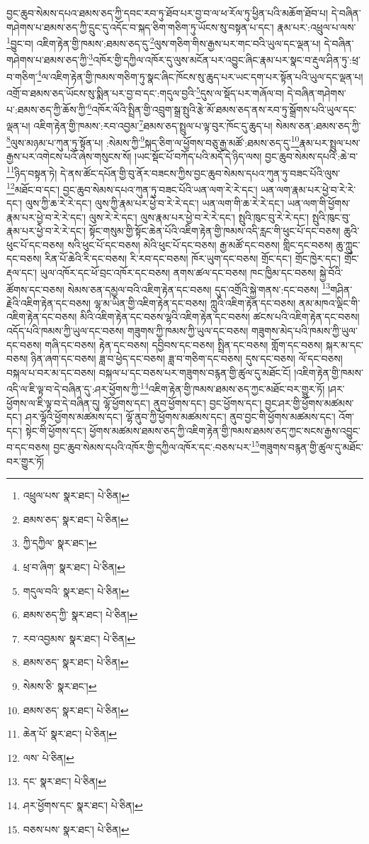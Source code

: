 བྱང་ཆུབ་སེམས་དཔའ་ཐམས་ཅད་ཀྱི་དབང་རབ་ཏུ་ཐོབ་པར་བྱ་བ་ལ་ཕ་རོལ་ཏུ་ཕྱིན་པའི་མཆོག་ཐོབ་པ། དེ་བཞིན་གཤེགས་པ་ཐམས་ཅད་ཀྱི་དྲུང་དུ་འདོང་བ་སྐད་ཅིག་གཅིག་ཏུ་ཡོངས་སུ་བསྟན་པ་དང་། རྣམ་པར་:འཕྲུལ་པ་ལས་\footnote{འཕྲུལ་པས་  སྣར་ཐང་།  པེ་ཅིན། }བྱུང་བ། འཇིག་རྟེན་གྱི་ཁམས་:ཐམས་ཅད་དུ་\footnote{ཐམས་ཅད་  སྣར་ཐང་།  པེ་ཅིན། }ལུས་གཅིག་གིས་རྒྱས་པར་གང་བའི་ཡུལ་དང་ལྡན་པ། དེ་བཞིན་གཤེགས་པ་ཐམས་ཅད་ཀྱི་\footnote{ཀྱི་དཀྱིལ་  སྣར་ཐང་། }འཁོར་གྱི་དཀྱིལ་འཁོར་དུ་ལུས་མངོན་པར་འབྱུང་ཞིང་རྣམ་པར་སྣང་བ་རྡུལ་ཤིན་ཏུ་:ཕྲ་བ་གཅིག་\footnote{ཕྲ་བ་ཞིག་  སྣར་ཐང་།  པེ་ཅིན། }ལ་འཇིག་རྟེན་གྱི་ཁམས་གཅིག་ཏུ་སྣང་ཞིང་ཁོངས་སུ་ཆུད་པར་ཡང་དག་པར་སྟོན་པའི་ཡུལ་དང་ལྡན་པ། འགྲོ་བ་ཐམས་ཅད་ཡོངས་སུ་སྨིན་པར་བྱ་བ་དང་:གདུལ་བྱའི་\footnote{གདུལ་བའི་  སྣར་ཐང་།  པེ་ཅིན། }དུས་ལ་སྡོད་པར་གཞོལ་བ། དེ་བཞིན་གཤེགས་པ་:ཐམས་ཅད་ཀྱི་ཆོས་ཀྱི་\footnote{ཐམས་ཅད་ཀྱི་  སྣར་ཐང་།  པེ་ཅིན། }འཁོར་ལོའི་སྤྲིན་གྱི་འབྲུག་སྒྲ་སྤུའི་རྩེ་མོ་ཐམས་ཅད་ནས་རབ་ཏུ་སྒྲོགས་པའི་ཡུལ་དང་ལྡན་པ། འཇིག་རྟེན་གྱི་ཁམས་:རབ་འབྱམ་\footnote{རབ་འབྱམས་  སྣར་ཐང་།  པེ་ཅིན། }ཐམས་ཅད་སྤྲུལ་པ་ལྟ་བུར་ཁོང་དུ་ཆུད་པ། སེམས་ཅན་:ཐམས་ཅད་ཀྱི་\footnote{ཐམས་ཅད་  སྣར་ཐང་།  པེ་ཅིན། }ལུས་མཉམ་པ་ཀུན་ཏུ་སྟོན་པ། :སེམས་ཀྱི་\footnote{སེམས་ཅི་  སྣར་ཐང་། }སྐད་ཅིག་ལ་ཕྱོགས་བཅུ་རྒྱ་མཚོ་:ཐམས་ཅད་དུ་\footnote{ཐམས་ཅད་  སྣར་ཐང་།  པེ་ཅིན། }རྣམ་པར་སྤྲུལ་པས་རྒྱས་པར་འགེངས་པའོ་ཞེས་གསུངས་སོ། །ཡང་སྡོང་པོ་བཀོད་པའི་མདོ་དེ་ཉིད་ལས། བྱང་ཆུབ་སེམས་དཔའི་:ཆེ་བ་\footnote{ཆེན་པོ་  སྣར་ཐང་།  པེ་ཅིན། }ཉིད་བསྟན་ཏེ། དེ་ནས་ཚོང་དཔོན་གྱི་བུ་ནོར་བཟངས་ཀྱིས་བྱང་ཆུབ་སེམས་དཔའ་ཀུན་ཏུ་བཟང་པོའི་ལུས་\footnote{ལས་  པེ་ཅིན། }མཐོང་བ་དང་། བྱང་ཆུབ་སེམས་དཔའ་ཀུན་ཏུ་བཟང་པོའི་ཡན་ལག་རེ་རེ་དང་། ཡན་ལག་རྣམ་པར་ཕྱེ་བ་རེ་རེ་དང་། ལུས་ཀྱི་ཆ་རེ་རེ་དང་། ལུས་ཀྱི་རྣམ་པར་ཕྱེ་བ་རེ་རེ་དང་། ཡན་ལག་གི་ཆ་རེ་རེ་དང་། ཡན་ལག་གི་ཕྱོགས་རྣམ་པར་ཕྱེ་བ་རེ་རེ་དང་། ལུས་རེ་རེ་དང་། ལུས་རྣམ་པར་ཕྱེ་བ་རེ་རེ་དང་། སྤུའི་ཁུང་བུ་རེ་རེ་དང་། སྤུའི་ཁུང་བུ་རྣམ་པར་ཕྱེ་བ་རེ་རེ་དང་། སྟོང་གསུམ་གྱི་སྟོང་ཆེན་པོའི་འཇིག་རྟེན་གྱི་ཁམས་འདི་རླང་གི་ཕུང་པོ་དང་བཅས། ཆུའི་ཕུང་པོ་དང་བཅས། སའི་ཕུང་པོ་དང་བཅས། མེའི་ཕུང་པོ་དང་བཅས། རྒྱ་མཚོ་དང་བཅས། གླིང་དང་བཅས། ཆུ་ཀླུང་དང་བཅས། རིན་པོ་ཆེའི་རི་དང་བཅས། རི་རབ་དང་བཅས། ཁོར་ཡུག་དང་བཅས། གྲོང་དང་། གྲོང་ཁྱེར་དང་། གྲོང་རྡལ་དང་། ཡུལ་འཁོར་དང་ཕོ་བྲང་འཁོར་དང་བཅས། ནགས་ཚལ་དང་བཅས། ཁང་ཁྱིམ་དང་བཅས། སྐྱེ་བོའི་ཚོགས་དང་བཅས། སེམས་ཅན་དམྱལ་བའི་འཇིག་རྟེན་དང་བཅས། དུད་འགྲོའི་སྐྱེ་གནས་:དང་བཅས། \footnote{དང་  སྣར་ཐང་།  པེ་ཅིན། }གཤིན་རྗེའི་འཇིག་རྟེན་དང་བཅས། ལྷ་མ་ཡིན་གྱི་འཇིག་རྟེན་དང་བཅས། ཀླུའི་འཇིག་རྟེན་དང་བཅས། ནམ་མཁའ་ལྡིང་གི་འཇིག་རྟེན་དང་བཅས། མིའི་འཇིག་རྟེན་དང་བཅས་ལྷའི་འཇིག་རྟེན་དང་བཅས། ཚངས་པའི་འཇིག་རྟེན་དང་བཅས། འདོད་པའི་ཁམས་ཀྱི་ཡུལ་དང་བཅས། གཟུགས་ཀྱི་ཁམས་ཀྱི་ཡུལ་དང་བཅས། གཟུགས་མེད་པའི་ཁམས་ཀྱི་ཡུལ་དང་བཅས། གཞི་དང་བཅས། རྟེན་དང་བཅས། དབྱིབས་དང་བཅས། སྤྲིན་དང་བཅས། གློག་དང་བཅས། སྐར་མ་དང་བཅས། ཉིན་ཞག་དང་བཅས། ཟླ་བ་ཕྱེད་དང་བཅས། ཟླ་བ་གཅིག་དང་བཅས། དུས་དང་བཅས། ལོ་དང་བཅས། བསྐལ་པ་བར་མ་དང་བཅས། བསྐལ་པ་དང་བཅས་པར་གཟུགས་བརྙན་གྱི་ཚུལ་དུ་མཐོང་ངོ། །འཇིག་རྟེན་གྱི་ཁམས་འདི་ལ་ཇི་ལྟ་བ་དེ་བཞིན་དུ་:ཤར་ཕྱོགས་ཀྱི་\footnote{ཤར་ཕྱོགས་དང་  སྣར་ཐང་།  པེ་ཅིན། }འཇིག་རྟེན་གྱི་ཁམས་ཐམས་ཅད་ཀྱང་མཐོང་བར་གྱུར་ཏོ། །ཤར་ཕྱོགས་ལ་ཇི་ལྟ་བ་དེ་བཞིན་དུ། ལྷོ་ཕྱོགས་དང་། ནུབ་ཕྱོགས་དང་། བྱང་ཕྱོགས་དང་། བྱང་ཤར་གྱི་ཕྱོགས་མཚམས་དང་། ཤར་ལྷོའི་ཕྱོགས་མཚམས་དང་། ལྷོ་ནུབ་ཀྱི་ཕྱོགས་མཚམས་དང་། ནུབ་བྱང་གི་ཕྱོགས་མཚམས་དང་། འོག་དང་། སྟེང་གི་ཕྱོགས་དང་། ཕྱོགས་མཚམས་ཐམས་ཅད་ཀྱི་འཇིག་རྟེན་གྱི་ཁམས་ཐམས་ཅད་ཀྱང་སངས་རྒྱས་འབྱུང་བ་དང་བཅས། བྱང་ཆུབ་སེམས་དཔའི་འཁོར་གྱི་དཀྱིལ་འཁོར་དང་:བཅས་པར་\footnote{བཅས་པས་  སྣར་ཐང་།  པེ་ཅིན། }གཟུགས་བརྙན་གྱི་ཚུལ་དུ་མཐོང་བར་གྱུར་ཏོ། 